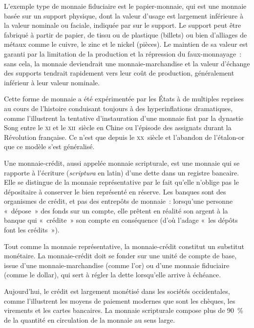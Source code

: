 
L'exemple type de monnaie fiduciaire est le papier-monnaie, qui est une monnaie basée sur un support physique, dont la valeur d'usage est largement inférieure à la valeur nominale ou faciale, indiquée par sur le support. Le support peut être fabriqué à partir de papier, de tissu ou de plastique (billets) ou bien d'alliages de métaux comme le cuivre, le zinc et le nickel (pièces). Le maintien de sa valeur est garanti par la limitation de la production et la répression du faux-monnayage~: sans cela, la monnaie deviendrait une monnaie-marchandise et la valeur d'échange des supports tendrait rapidement vers leur coût de production, généralement inférieur à leur valeur nominale.

Cette forme de monnaie a été expérimentée par les États à de multiples reprises au cours de l'histoire conduisant toujours à des hyperinflations dramatiques, comme l'illustrent la tentative d'instauration d'une monnaie fiat par la dynastie Song entre le \textsc{xi}\ieme{} et le \textsc{xii}\ieme{}~siècle en Chine ou l'épisode des assignats durant la Révolution française. Ce n'est que depuis le \textsc{xx}\ieme{}~siècle et l'abandon de l'étalon-or que ce modèle s'est généralisé.


Une monnaie-crédit, aussi appelée monnaie scripturale, est une monnaie qui se rapporte à l'écriture (\emph{scriptura} en latin) d'une dette dans un registre bancaire. Elle se distingue de la monnaie représentative par le fait qu'elle n'oblige pas le dépositaire à conserver le bien représenté en réserve. Les banques sont des organismes de crédit, et pas des entrepôts de monnaie~: lorsqu'une personne «~dépose~» des fonds sur un compte, elle prêtent en réalité son argent à la banque qui «~crédite~» son compte en conséquence (d'où l'adage «~les dépôts font les crédits~»). 

Tout comme la monnaie représentative, la monnaie-crédit constitut un substitut monétaire. La monnaie-crédit doit se fonder sur une unité de compte de base, issue d'une monnaie-marchandise (comme l'or) ou d'une monnaie fiduciaire (comme le dollar), qui sert à régler la dette lorsqu'elle arrive à échéance.

Aujourd'hui, le crédit est largement monétisé dans les sociétés occidentales, comme l'illustrent les moyens de paiement modernes que sont les chèques, les virements et les cartes bancaires. La monnaie scripturale compose plus de 90~\% de la quantité en circulation de la monnaie au sens large.

